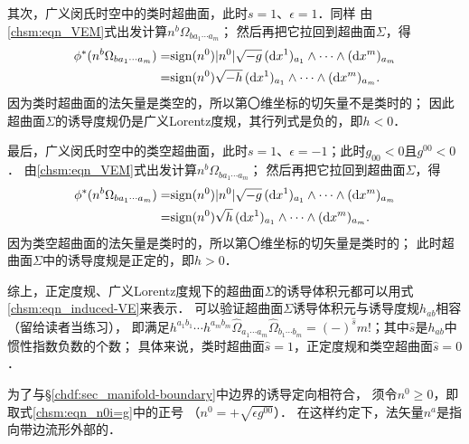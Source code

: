 其次，广义闵氏时空中的类时超曲面，此时$s=1$、$\epsilon=1$．同样
由\eqref{chsm:eqn_VEM}式出发计算$n^b \Omega_{b a_1 \cdots a_m}$；
然后再把它拉回到超曲面$\Sigma$，得 %
\begin{equation}\label{chsm:eqn_induced-VE-TLHS}
\begin{aligned}
    \phi^*( n^b \Omega_{b a_1 \cdots a_m})=& {\rm sign}(n^0) |n^0| \sqrt{-g}\,
    ({\rm d}x^1)_{a_1} \wedge \cdots \wedge({\rm d}x^m)_{a_m} \\
    =&{\rm sign}(n^0) \sqrt{-h}\, ({\rm d}x^1)_{a_1} \wedge \cdots \wedge({\rm d}x^m)_{a_m}.
\end{aligned}
\end{equation}
因为类时超曲面的法矢量是类空的，所以第〇维坐标的切矢量不是类时的；
因此超曲面$\Sigma$的诱导度规仍是广义Lorentz度规，其行列式是负的，即$h<0$．

最后，广义闵氏时空中的类空超曲面，此时$s=1$、$\epsilon=-1$；此时$g_{00}<0$且$g^{00}<0$．
由\eqref{chsm:eqn_VEM}式出发计算$n^b \Omega_{b a_1 \cdots a_m}$；
然后再把它拉回到超曲面$\Sigma$，得 %
\begin{equation}\label{chsm:eqn_induced-VE-SLHS}
\begin{aligned}
    \phi^*( n^b \Omega_{b a_1 \cdots a_m})=& {\rm sign}(n^0) |n^0| \sqrt{-g}\,
      ({\rm d}x^1)_{a_1} \wedge \cdots \wedge({\rm d}x^m)_{a_m} \\
    =&{\rm sign}(n^0)\sqrt{h}\, ({\rm d}x^1)_{a_1} \wedge \cdots \wedge({\rm d}x^m)_{a_m}.
\end{aligned}
\end{equation}
因为类空超曲面的法矢量是类时的，所以第〇维坐标的切矢量是类时的；
此时超曲面$\Sigma$中的诱导度规是正定的，即$h>0$．

综上，正定度规、广义Lorentz度规下的超曲面$\Sigma$的诱导体积元都可以用式\eqref{chsm:eqn_induced-VE}来表示．
可以验证超曲面$\Sigma$诱导体积元与诱导度规$h_{ab}$相容（留给读者当练习），
即满足$h^{a_1b_1}\cdots h^{a_{m}b_{m}} \hat{\Omega}_{a_1 \cdots a_{m}} \hat{\Omega}_{b_1 \cdots b_{m}}
= (-)^{\hat{s}} m!$；其中$\hat{s}$是$h_{ab}$中惯性指数负数的个数；
具体来说，类时超曲面$\hat{s}=1$，正定度规和类空超曲面$\hat{s}=0$．

为了与\S\ref{chdf:sec_manifold-boundary}中边界的诱导定向相符合，
须令$n^0\geqslant 0$，即取式\eqref{chsm:eqn_n0i=g}中的正号
（$n^0 = + \sqrt{\epsilon g^{00}}$）．
在这样约定下，法矢量$n^a$是指向带边流形外部的．



